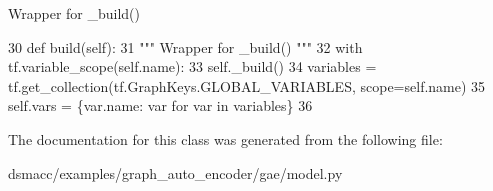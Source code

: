 \begin{DoxyVerb}Wrapper for _build() \end{DoxyVerb}
 
\begin{DoxyCode}
30     \textcolor{keyword}{def }build(self):
31         \textcolor{stringliteral}{""" Wrapper for \_build() """}
32         with tf.variable\_scope(self.name):
33             self.\_build()
34         variables = tf.get\_collection(tf.GraphKeys.GLOBAL\_VARIABLES, scope=self.name)
35         self.vars = \{var.name: var \textcolor{keywordflow}{for} var \textcolor{keywordflow}{in} variables\}
36 
\end{DoxyCode}


The documentation for this class was generated from the following file\+:\begin{DoxyCompactItemize}
\item 
dsmacc/examples/graph\+\_\+auto\+\_\+encoder/gae/model.\+py\end{DoxyCompactItemize}
